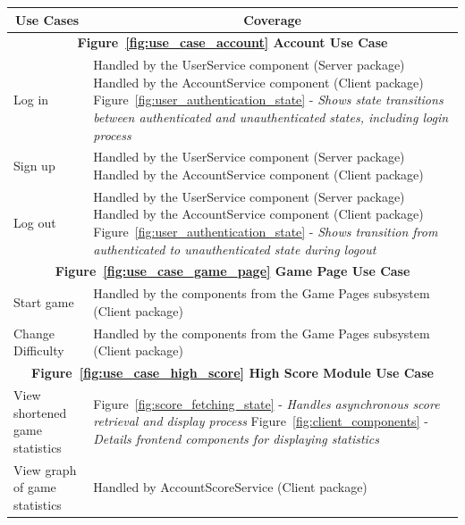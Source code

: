 \documentclass[11pt,a4paper]{article}
\begin{document}
\begin{table}
\begin{tabular}{|p{}|p{}|}
\hline
\multicolumn{1}{|c|}{\textbf{Use Cases}}    & \multicolumn{1}{|c|}{\textbf{Coverage}}                   \\ \hline
\multicolumn{2}{|c|}{\textbf {Figure~\ref{fig:use_case_account} Account Use Case} }                                          \\ \hline
Log in& Handled by the UserService component (Server package)\newline
Handled by the AccountService component (Client package)\newline
Figure~\ref{fig:user_authentication_state} - \textit{Shows state transitions between authenticated and unauthenticated states, including login process}\\
\hline
Sign up& Handled by the UserService component (Server package)\newline
Handled by the AccountService component (Client package)\\
\hline
Log out& Handled by the UserService component (Server package)\newline
Handled by the AccountService component (Client package)\newline
Figure~\ref{fig:user_authentication_state} - \textit{Shows transition from authenticated to unauthenticated state during logout}\\
\hline
\multicolumn{2}{|c|}{\textbf {Figure~\ref{fig:use_case_game_page} Game Page Use Case} }                                      \\
\hline
Start game& Handled by the components from the Game Pages subsystem (Client package)\\
\hline
Change Difficulty& Handled by the components from the Game Pages subsystem (Client package)\\
\hline
\multicolumn{2}{|c|}{\textbf {Figure~\ref{fig:use_case_high_score} High Score Module Use Case} }                                         \\
\hline
View shortened game statistics& Figure~\ref{fig:score_fetching_state} - \textit{Handles asynchronous score retrieval and display process}\newline 
Figure~\ref{fig:client_components} - \textit{Details frontend components for displaying statistics}
\\
\hline
View graph of game statistics& Handled by AccountScoreService (Client package)\newline

\end{tabular}
\end{table}
\end{document}
